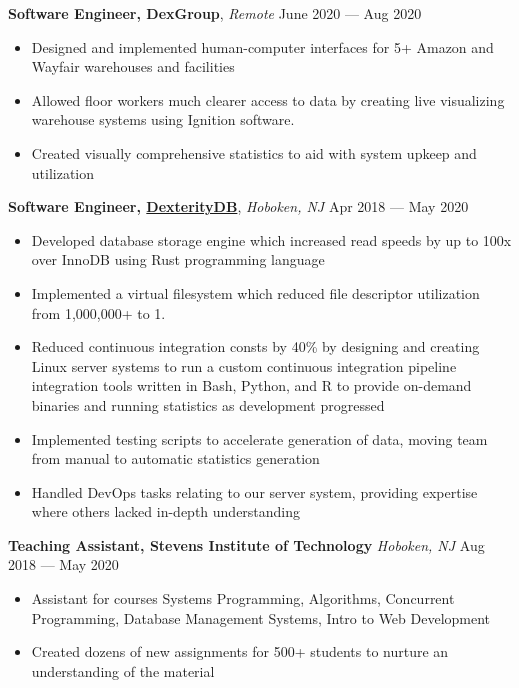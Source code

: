 \documentclass[10pt,letterpaper,roman]{moderncv}
\begin{document}
\hfill

\textbf{Software Engineer, DexGroup}, \textit{Remote} \hfill June 2020 --- Aug 2020
\begin{itemize}
\item Designed and implemented human-computer interfaces for 5+ Amazon and Wayfair warehouses
  and facilities
\item Allowed floor workers much clearer access to data by creating live
  visualizing warehouse systems using Ignition software.
\item Created visually comprehensive statistics to aid with system upkeep and
  utilization
\end{itemize}\space

\hfill

\textbf{Software Engineer, \href{https://dexteritydb.com}{DexterityDB}},
\textit{Hoboken, NJ} \hfill Apr 2018 --- May 2020
\begin{itemize}
\item Developed database storage engine which increased read speeds by up to 100x over InnoDB using Rust programming language
\item Implemented a virtual filesystem which reduced file descriptor utilization
  from 1,000,000+ to 1.
\item Reduced continuous integration consts by 40\% by designing and creating
  Linux server systems to run a custom continuous integration pipeline
  integration tools written in Bash, Python, and R to provide on-demand binaries
  and running statistics as development progressed
\item Implemented testing scripts to accelerate generation of data, moving team from manual to automatic statistics generation
\item Handled DevOps tasks relating to our server system, providing expertise
  where others lacked in-depth understanding
\end{itemize}\space

\hfill

\textbf{Teaching Assistant, Stevens Institute of Technology} \textit{Hoboken,
  NJ} \hfill Aug 2018 --- May 2020
\begin{itemize}
\item Assistant for courses Systems Programming, Algorithms, Concurrent
  Programming, Database Management Systems, Intro to Web Development
\item Created dozens of new assignments for 500+ students to nurture an
  understanding of the material
\end{itemize}
\end{document}
